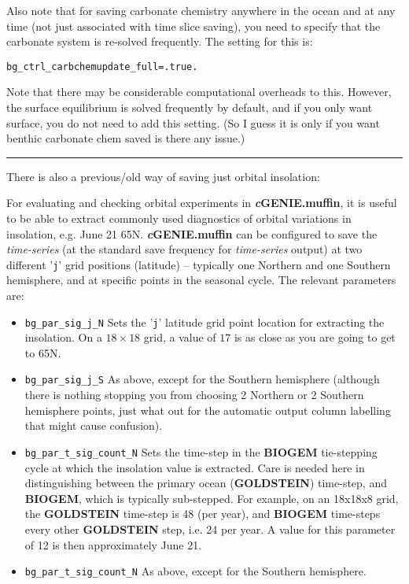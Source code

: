 Also note that for saving carbonate chemistry anywhere in the ocean and at any time (not just associated with time slice saving), you need to specify that the carbonate system is re-solved frequently. The setting for this is:
\begin{verbatim}
bg_ctrl_carbchemupdate_full=.true.
\end{verbatim}
Note that there may be considerable computational overheads to this.
However, the surface equilibrium is solved frequently by default, and if you only want surface, you do not need to add this setting. (So I guess it is only if you want benthic carbonate chem saved is there any issue.)

\vspace{1mm}
\noindent\rule{4cm}{0.5pt}
\vspace{2mm}

\noindent There is also a previous/old way of saving just orbital insolation:

For evaluating and checking orbital experiments in \textbf{\textit{c}GENIE.muffin}, it is useful to be able to extract commonly used diagnostics of orbital variations in insolation, e.g. June 21 65N. \textbf{\textit{c}GENIE.muffin} can be configured to save the \textit{time-series} (at the standard save frequency for \textit{time-series} output) at two different '\texttt{j}' grid positions (latitude) -- typically one Northern and one Southern hemisphere, and at specific points in the seasonal cycle. The relevant parameters are:

\begin{itemize}
\vspace{1mm}
\item \texttt{bg\_par\_sig\_j\_N}
Sets the '\texttt{j}'  latitude grid point location for extracting the insolation. On a \(18\times18\) grid, a value of \(17\) is as close as you are going to get to 65N.
\vspace{1mm}
\item \texttt{bg\_par\_sig\_j\_S}
As above, except for the Southern hemisphere (although there is nothing stopping you from choosing 2 Northern or 2 Southern hemisphere points, just what out for the automatic output column labelling that might cause confusion).
\vspace{1mm}
\item \texttt{bg\_par\_t\_sig\_count\_N}
Sets the time-step in the \textbf{BIOGEM} tie-stepping cycle at which the insolation value is extracted. Care is needed here in distinguishing between the primary ocean (\textbf{GOLDSTEIN}) time-step, and \textbf{BIOGEM}, which is typically sub-stepped. For  example, on an 18x18x8 grid, the \textbf{GOLDSTEIN} time-step is 48 (per year), and \textbf{BIOGEM} time-steps every other \textbf{GOLDSTEIN} step, i.e. 24 per year. A value for this parameter of 12 is then approximately June 21.
\vspace{1mm}
\item \texttt{bg\_par\_t\_sig\_count\_N}
As above, except for the Southern hemisphere.
\end{itemize}
\vspace{2mm}

